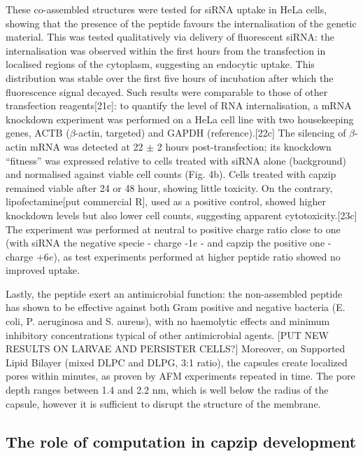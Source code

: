 These co-assembled structures were tested for siRNA uptake in HeLa cells, showing that the presence of the peptide favours the internalisation of the genetic material. This was tested qualitatively via delivery of fluorescent siRNA: the internalisation was observed within the first hours from the transfection in localised regions of the cytoplasm, suggesting an endocytic uptake. This distribution was stable over the first five hours of incubation after which the fluorescence signal decayed.
%
Such results were comparable to those of other transfection reagents[21c]: to quantify the level of RNA internalisation, a mRNA knockdown experiment was performed on a HeLa cell line with two housekeeping genes, ACTB ($\beta$-actin, targeted) and GAPDH (reference).[22c]
%
The silencing of $\beta$-actin mRNA was detected at 22 $\pm$ 2 hours post-transfection; its knockdown ``fitness” was expressed relative to cells treated with siRNA alone (background) and normalised against viable cell counts (Fig. 4b). Cells treated with capzip remained viable after 24 or 48 hour, showing little toxicity.
%
On the contrary, lipofectamine[put commercial R], used as a positive control, showed higher knockdown levels but also lower cell counts, suggesting apparent cytotoxicity.[23c]
%
The experiment was performed at neutral to positive charge ratio close to one (with siRNA the negative specie - charge -1$e$ - and capzip the positive one - charge +6$e$), as test experiments performed at higher peptide ratio showed no improved uptake.

Lastly, the peptide exert an antimicrobial function: the non-assembled peptide has shown to be effective against both Gram positive and negative bacteria (E. coli, P. aeruginosa and S. aureus), with no haemolytic effects and minimum inhibitory concentrations typical of other antimicrobial agents. [PUT NEW RESULTS ON LARVAE AND PERSISTER CELLS?]
%
Moreover, on Supported Lipid Bilayer (mixed DLPC and DLPG, 3:1 ratio), the capsules create localized pores within minutes, as proven by AFM experiments repeated in time. The pore depth ranges between 1.4 and 2.2 nm, which is well below the radius of the capsule, however it is sufficient to disrupt the structure of the membrane.



\subsection{The role of computation in capzip development}

